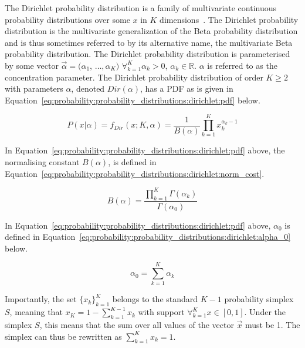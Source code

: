 The Dirichlet probability distribution is a family of multivariate continuous probability distributions over some $x$ in $K$ dimensions~\cite{ref:wackerly:2014}. The Dirichlet probability distribution is the multivariate generalization of the Beta probability distribution and is thus sometimes referred to by its alternative name, the multivariate Beta probability distribution. The Dirichlet probability distribution is parameterised by some vector $\vec{\alpha} = (\alpha_{1}$,  $\dots, \alpha_{K})$ $\forall_{k=1}^{K} \alpha_{k} > 0$, $\alpha_{k} \in \mathbb{R}$. $\alpha$ is referred to as the concentration parameter. The Dirichlet probability distribution of order $K \geq 2$ with parameters $\alpha$, denoted $Dir(\alpha)$, has a \acs{PDF} as is given in Equation~\eqref{eq:probability:probability_distributions:dirichlet:pdf} below.

\begin{equation}
      \label{eq:probability:probability_distributions:dirichlet:pdf}
      P(x \vert \alpha) =  f_{Dir}(x; K, \alpha) = \frac{1}{B(\alpha)}  \prod_{k=1}^{K} x_{k}^{\alpha_{k} - 1}
\end{equation}

\noindent
In Equation~\eqref{eq:probability:probability_distributions:dirichlet:pdf} above, the normalising constant $B(\alpha)$, is defined in Equation~\eqref{eq:probability:probability_distributions:dirichlet:norm_cost}.

\begin{equation}
      \label{eq:probability:probability_distributions:dirichlet:norm_cost}
      B(\alpha) = \frac{\prod_{k=1}^{K} \Gamma(\alpha_{k})}{\Gamma(\alpha_{0})}
\end{equation}

\noindent
In Equation~\eqref{eq:probability:probability_distributions:dirichlet:pdf} above, $\alpha_{0}$ is defined in Equation~\eqref{eq:probability:probability_distributions:dirichlet:alpha_0} below.

\begin{equation}
      \label{eq:probability:probability_distributions:dirichlet:alpha_0}
      \alpha_{0} = \sum_{k=1}^{K}\alpha_{k}
\end{equation}

\noindent
Importantly, the set $\{x_{k}\}_{k=1}^{K}$ belongs to the standard $K-1$ probability simplex $S$, meaning that $x_{K} = 1 - \sum_{k=1}^{K-1}x_{k}$ with support $\forall_{k=1}^{K} x \in [0,1]$. Under the simplex $S$, this means that the sum over all values of the vector $\vec{x}$ must be 1. The simplex can thus be rewritten as $\sum_{k=1}^{K}x_{k} = 1$.

